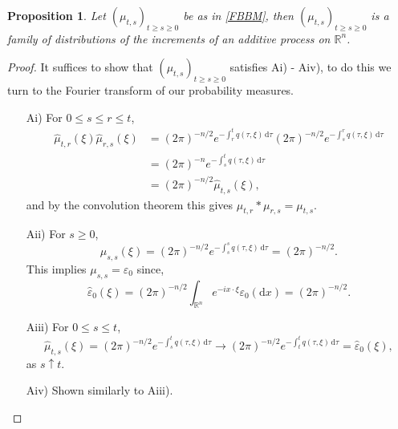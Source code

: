\documentclass[a4paper, 12pt]{report}
\newtheorem{proposition}[theorem]{Proposition}
\theoremstyle{remark}
\theoremstyle{definition}
\begin{document}
\begin{proposition}
Let $(\mu_{t, s})_{t \ge s \ge 0}$ be as in \eqref{FBBM}, then $(\mu_{t, s})_{t \ge s \ge 0}$ is a family of distributions of the increments of an additive process on $\mathbb{R}^n$.
\end{proposition}
\begin{proof}
It suffices to show that $(\mu_{t, s})_{t \ge s \ge 0}$ satisfies Ai) - Aiv), to do this we turn to the Fourier transform of our probability measures.
\begin{itemize}

\item[Ai)] For $0 \le s \le r \le t$,
\begin{align}
\hat{\mu}_{t, r}(\xi)\hat{\mu}_{r, s}(\xi) & = (2\pi)^{-n/2}e^{-\int_r^tq(\tau, \xi)\,\mathrm{d}\tau}(2\pi)^{-n/2}e^{-\int_s^rq(\tau, \xi)\,\mathrm{d}\tau}\nonumber\\
& = (2\pi)^{-n}e^{-\int_s^tq(\tau, \xi)\,\mathrm{d}\tau}\nonumber\\
& = (2\pi)^{-n/2}\hat{\mu}_{t, s}(\xi)\nonumber,
\end{align}
and by the convolution theorem this gives $\mu_{t, r}\ast\mu_{r, s} = \mu_{t, s}$.

\item[Aii)] For $s \ge 0$,
$$
\hat{\mu}_{s, s}(\xi) = (2\pi)^{-n/2}e^{-\int_s^sq(\tau, \xi)\,\mathrm{d}\tau} = (2\pi)^{-n/2}.
$$
This implies $\mu_{s, s} = \varepsilon_0$ since,
$$
\hat{\varepsilon}_0(\xi) = (2\pi)^{-n/2}\int_{\mathbb{R}^n}e^{-ix\cdot\xi}\varepsilon_0(\mathrm{d}x) = (2\pi)^{-n/2}.
$$

\item[Aiii)] For $0 \le s \le t$,
$$
\hat{\mu}_{t, s}(\xi) = (2\pi)^{-n/2}e^{-\int_s^tq(\tau, \xi)\,\mathrm{d}\tau} \to (2\pi)^{-n/2}e^{-\int_t^tq(\tau, \xi)\,\mathrm{d}\tau} = \hat{\varepsilon}_0(\xi),
$$
as $s \uparrow t$.

\item[Aiv)] Shown similarly to Aiii).

\end{itemize}
\end{proof}
\end{document}
